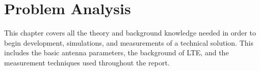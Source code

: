 \chapter{Problem Analysis}
\label{cha:problem_analysis}

\begin{aautop}
This chapter covers all the theory and background knowledge needed in order to begin development, simulations, and measurements of a technical solution. This includes the basic antenna parameters, the background of LTE, and the measurement techniques used throughout the report.
\end{aautop}
